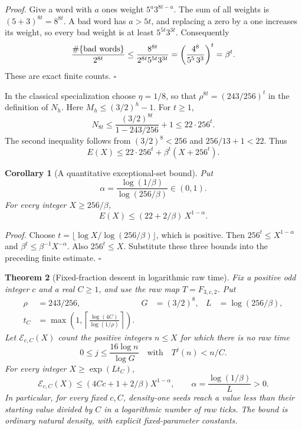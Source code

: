 \documentclass[11pt,letterpaper]{article}
\newtheorem{theorem}{Theorem}
\newtheorem{corollary}[theorem]{Corollary}
\newenvironment{proof}{\noindent\textit{Proof.}}{\hfill\(\square\)}
\begin{document}
\begin{proof}
Give a word with \(a\) ones weight \(5^a3^{8t-a}\).
The sum of all weights is \((5+3)^{8t}=8^{8t}\).
A bad word has \(a>5t\), and replacing a zero by a one increases its
weight, so every bad weight is at least \(5^{5t}3^{3t}\).
Consequently
\[
\frac{\#\{\hbox{bad words}\}}{2^{8t}}
\le
\frac{8^{8t}}{2^{8t}5^{5t}3^{3t}}
=
\left(\frac{4^8}{5^5\,3^3}\right)^t
=\beta^t.
\]
These are exact finite counts.
\end{proof}

In the classical specialization choose \(\eta=1/8\), so that
\(\rho^{8t}=(243/256)^t\) in the definition of \(N_h\).
Here \(M_h\le(3/2)^h-1\). For \(t\ge1\),
\[
N_{8t}\le
\frac{(3/2)^{8t}}{1-243/256}+1
\le 22\cdot256^t.
\]
The second inequality follows from
\((3/2)^8<256\) and \(256/13+1<22\).
Thus
\[
E(X)\le22\cdot256^t+\beta^t(X+256^t).
\]

\begin{corollary}[A quantitative exceptional-set bound]
\label{cor:power}
Put
\[
\alpha=\frac{\log(1/\beta)}{\log(256/\beta)}\in(0,1).
\]
For every integer \(X\ge256/\beta\),
\[
E(X)\le (22+2/\beta)\,X^{1-\alpha}.
\]
\end{corollary}

\begin{proof}
Choose \(t=\lfloor\log X/\log(256/\beta)\rfloor\), which is positive.
Then \(256^t\le X^{1-\alpha}\) and
\(\beta^t\le\beta^{-1}X^{-\alpha}\).
Also \(256^t\le X\). Substitute these three bounds into the preceding
finite estimate.
\end{proof}

\begin{theorem}[Fixed-fraction descent in logarithmic raw time]
\label{thm:fractional}
Fix a positive odd integer \(c\) and a real \(C\ge1\), and use the
raw map \(T=F_{3,c,2}\). Put
\[
\begin{aligned}
\rho&=243/256, & G&=(3/2)^8, & L&=\log(256/\beta),\\
t_C&=\max\left(1,\left\lceil\frac{\log(4C)}{\log(1/\rho)}\right\rceil\right).
\end{aligned}
\]
Let \(\mathcal E_{c,C}(X)\) count the positive integers \(n\le X\)
for which there is no raw time
\[
0\le j\le\frac{16\log n}{\log G}\quad\text{with}\quad T^j(n)<n/C.
\]
For every integer \(X\ge\exp(Lt_C)\),
\[
\mathcal E_{c,C}(X)
\le(4Cc+1+2/\beta)X^{1-\alpha},
\qquad \alpha=\frac{\log(1/\beta)}L>0.
\]
In particular, for every fixed \(c,C\), density-one seeds reach a
value less than their starting value divided by \(C\) in a logarithmic
number of raw ticks. The bound is ordinary natural density, with
explicit fixed-parameter constants.
\end{theorem}
\end{document}
